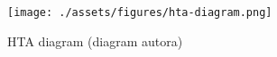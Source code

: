 \begin{landscape}
    \begin{figure}[p]
        \centering
        \texttt{[image: ./assets/figures/hta-diagram.png]}
        \captionsetup{justification=centering}
        \caption[HTA diagram]{HTA diagram (diagram autora)}
        \label{fig:hta}
    \end{figure}
\end{landscape}
